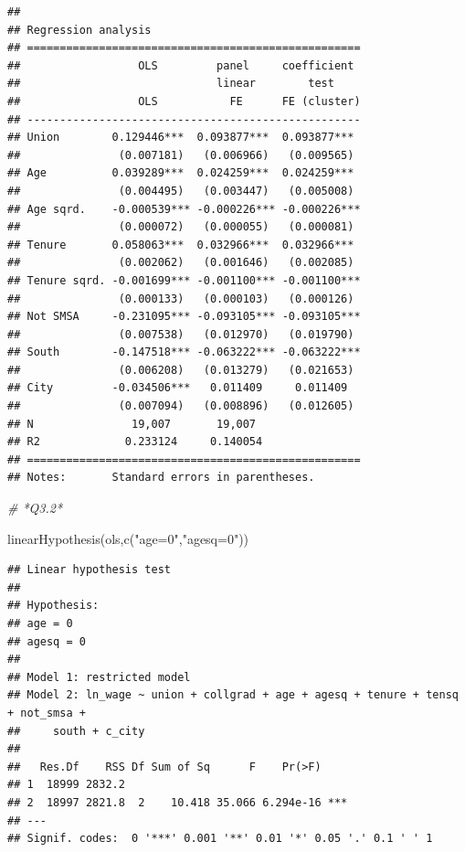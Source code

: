 \documentclass[
]{article}
\newenvironment{Shaded}{\begin{snugshade}}{\end{snugshade}}
\newcommand{\CommentTok}[1]{\textcolor[rgb]{0.56,0.35,0.01}{\textit{#1}}}
\newcommand{\FunctionTok}[1]{\textcolor[rgb]{0.00,0.00,0.00}{#1}}
\newcommand{\NormalTok}[1]{#1}
\newcommand{\StringTok}[1]{\textcolor[rgb]{0.31,0.60,0.02}{#1}}
\begin{document}
\begin{verbatim}
## 
## Regression analysis
## ===================================================
##                  OLS         panel     coefficient 
##                              linear        test    
##                  OLS           FE      FE (cluster)
## ---------------------------------------------------
## Union        0.129446***  0.093877***  0.093877*** 
##               (0.007181)   (0.006966)   (0.009565) 
## Age          0.039289***  0.024259***  0.024259*** 
##               (0.004495)   (0.003447)   (0.005008) 
## Age sqrd.    -0.000539*** -0.000226*** -0.000226***
##               (0.000072)   (0.000055)   (0.000081) 
## Tenure       0.058063***  0.032966***  0.032966*** 
##               (0.002062)   (0.001646)   (0.002085) 
## Tenure sqrd. -0.001699*** -0.001100*** -0.001100***
##               (0.000133)   (0.000103)   (0.000126) 
## Not SMSA     -0.231095*** -0.093105*** -0.093105***
##               (0.007538)   (0.012970)   (0.019790) 
## South        -0.147518*** -0.063222*** -0.063222***
##               (0.006208)   (0.013279)   (0.021653) 
## City         -0.034506***   0.011409     0.011409  
##               (0.007094)   (0.008896)   (0.012605) 
## N               19,007       19,007                
## R2             0.233124     0.140054               
## ===================================================
## Notes:       Standard errors in parentheses.
\end{verbatim}

\begin{Shaded}
\begin{Highlighting}[]
\CommentTok{\# *Q3.2*}

  \FunctionTok{linearHypothesis}\NormalTok{(ols,}\FunctionTok{c}\NormalTok{(}\StringTok{"age=0"}\NormalTok{,}\StringTok{"agesq=0"}\NormalTok{))}
\end{Highlighting}
\end{Shaded}

\begin{verbatim}
## Linear hypothesis test
## 
## Hypothesis:
## age = 0
## agesq = 0
## 
## Model 1: restricted model
## Model 2: ln_wage ~ union + collgrad + age + agesq + tenure + tensq + not_smsa + 
##     south + c_city
## 
##   Res.Df    RSS Df Sum of Sq      F    Pr(>F)    
## 1  18999 2832.2                                  
## 2  18997 2821.8  2    10.418 35.066 6.294e-16 ***
## ---
## Signif. codes:  0 '***' 0.001 '**' 0.01 '*' 0.05 '.' 0.1 ' ' 1
\end{verbatim}
\end{document}

